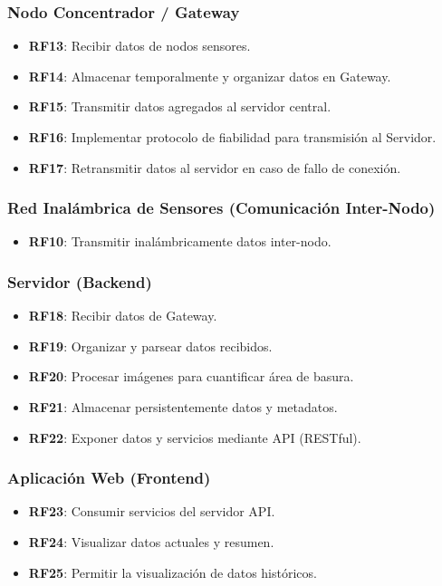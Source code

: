 \subsubsection*{Nodo Concentrador / Gateway}
\begin{itemize}
    \item \textbf{RF13}: Recibir datos de nodos sensores.
    \item \textbf{RF14}: Almacenar temporalmente y organizar datos en Gateway.
    \item \textbf{RF15}: Transmitir datos agregados al servidor central.
    \item \textbf{RF16}: Implementar protocolo de fiabilidad para transmisión al Servidor.
    \item \textbf{RF17}: Retransmitir datos al servidor en caso de fallo de conexión.
\end{itemize}

\subsubsection*{Red Inalámbrica de Sensores (Comunicación Inter-Nodo)}
\begin{itemize}
    \item \textbf{RF10}: Transmitir inalámbricamente datos inter-nodo.
\end{itemize}

\subsubsection*{Servidor (Backend)}
\begin{itemize}
    \item \textbf{RF18}: Recibir datos de Gateway.
    \item \textbf{RF19}: Organizar y parsear datos recibidos.
    \item \textbf{RF20}: Procesar imágenes para cuantificar área de basura.
    \item \textbf{RF21}: Almacenar persistentemente datos y metadatos.
    \item \textbf{RF22}: Exponer datos y servicios mediante API (RESTful).
\end{itemize}

\subsubsection*{Aplicación Web (Frontend)}
\begin{itemize}
    \item \textbf{RF23}: Consumir servicios del servidor API.
    \item \textbf{RF24}: Visualizar datos actuales y resumen.
    \item \textbf{RF25}: Permitir la visualización de datos históricos.
\end{itemize}

